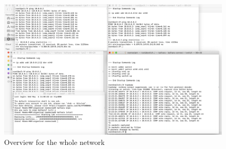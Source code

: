 \begin{figure}[H]
\centering
  \includegraphics[width=500pt]{Images/last.png}
  \caption{Overview for the whole network}
  \label{fig:3.15}
\end{figure}